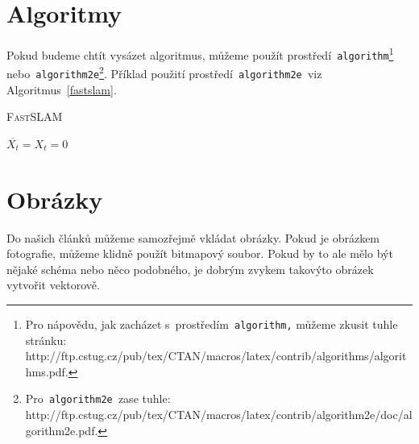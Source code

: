 \documentclass[a4paper, 11pt]{article}
\begin{document}
\section{Algoritmy}\label{algoritmy}
Pokud budeme chtít vysázet algoritmus, můžeme použít prostředí\texttt{ algorithm}\footnote{
Pro nápovědu, jak zacházet s~prostředím\texttt{ algorithm,} můžeme zkusit tuhle stránku: \\
http://ftp.cstug.cz/pub/tex/CTAN/macros/latex/contrib/algorithms/algorithms.pdf.}
nebo\texttt{ algorithm2e}\footnote{
Pro\texttt{ algorithm2e }zase tuhle:
http://ftp.cstug.cz/pub/tex/CTAN/macros/latex/contrib/algorithm2e/doc/algorithm2e.pdf.
}. Příklad použití prostředí\texttt{ algorithm2e }viz Algoritmus~\ref{fastslam}. \\
\IncMargin{1.5em}
\begin{algorithm}\label{fastslam}
	\caption{\textsc{FastSLAM}}

	\SetNlSty{}{}{:}
	\SetNlSkip{0.4em}
	\SetInd{1em}{1em}

	\Indm\Indmm
	\Indp\Indpp
	\BlankLine

	$ \overline{X_t} = X_t = 0 $ \\



\end{algorithm}
\DecMargin{1.5em}

\section{Obrázky}
Do našich článků můžeme samozřejmě vkládat obrázky. Pokud je obrázkem fotografie,
můžeme klidně použít bitmapový soubor. Pokud by to ale mělo být nějaké schéma nebo
něco podobného, je dobrým zvykem takovýto obrázek vytvořit vektorově.
\end{document}
